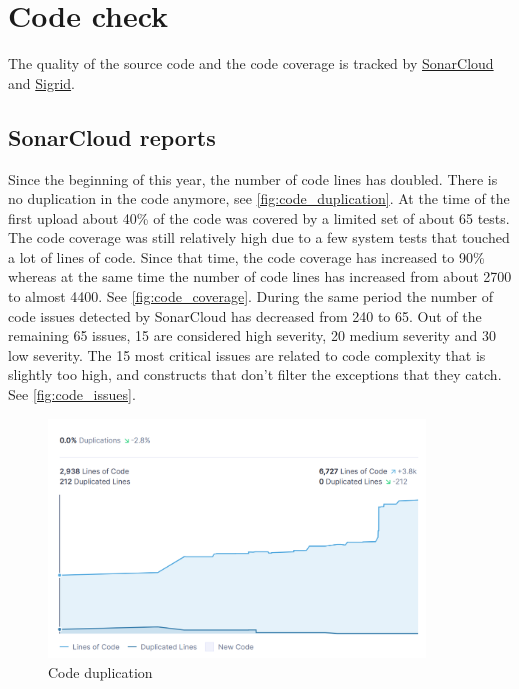 \section{Code check}
The quality of the \dfastmi source code and the code coverage is tracked by \href{https://sonarcloud.io/project/overview?id=Deltares_D-FAST_Morphological_Impact}{SonarCloud} and \href{https://sigrid-says.com/deltares/dfast-mi/-/overview}{Sigrid}.

\subsection{SonarCloud reports}
Since the beginning of this year, the number of code lines has doubled.
There is no duplication in the code anymore, see \autoref{fig:code_duplication}.
At the time of the first upload about 40\% of the code was covered by a limited set of about 65 tests.
The code coverage was still relatively high due to a few system tests that touched a lot of lines of code.
Since that time, the code coverage has increased to 90\% whereas at the same time the number of code lines has increased from about 2700 to almost 4400.
See \autoref{fig:code_coverage}.
During the same period the number of code issues detected by SonarCloud has decreased from 240 to 65.
Out of the remaining 65 issues, 15 are considered high severity, 20 medium severity and 30 low severity.
The 15 most critical issues are related to code complexity that is slightly too high, and  constructs that don't filter the exceptions that they catch.
See \autoref{fig:code_issues}.

\begin{figure}
\center
\includegraphics[width=10cm]{figures/code_duplication.png}
\caption{Code duplication}
\label{fig:code_duplication}
\end{figure}

